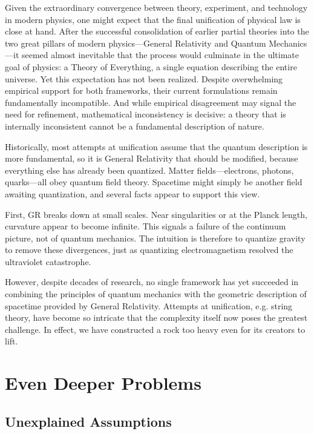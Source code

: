 Given the extraordinary convergence between theory, experiment, and technology in modern physics, one might expect that the final unification of physical law is close at hand. After the successful consolidation of earlier partial theories into the two great pillars of modern physics—General Relativity and Quantum Mechanics—it seemed almost inevitable that the process would culminate in the ultimate goal of physics: a Theory of Everything, a single equation describing the entire universe. Yet this expectation has not been realized. Despite overwhelming empirical support for both frameworks, their current formulations remain fundamentally incompatible. And while empirical disagreement may signal the need for refinement, mathematical inconsistency is decisive: a theory that is internally inconsistent cannot be a fundamental description of nature.

Historically, most attempts at unification assume that the quantum description is more fundamental, so it is General Relativity that should be modified, because everything else has already been quantized. Matter fields—electrons, photons, quarks—all obey quantum field theory. Spacetime might simply be another field awaiting quantization, and several facts appear to support this view.

First, GR breaks down at small scales. Near singularities or at the Planck length, curvature appear to become infinite. This signals a failure of the continuum picture, not of quantum mechanics. The intuition is therefore to quantize gravity to remove these divergences, just as quantizing electromagnetism resolved the ultraviolet catastrophe.

However, despite decades of research, no single framework has yet succeeded in combining the principles of quantum mechanics with the geometric description of spacetime provided by General Relativity. Attempts at unification, e.g. string theory, have become so intricate that the complexity itself now poses the greatest challenge. In effect, we have constructed a rock too heavy even for its creators to lift.


\section{Even Deeper Problems}

\subsection*{Unexplained Assumptions}

